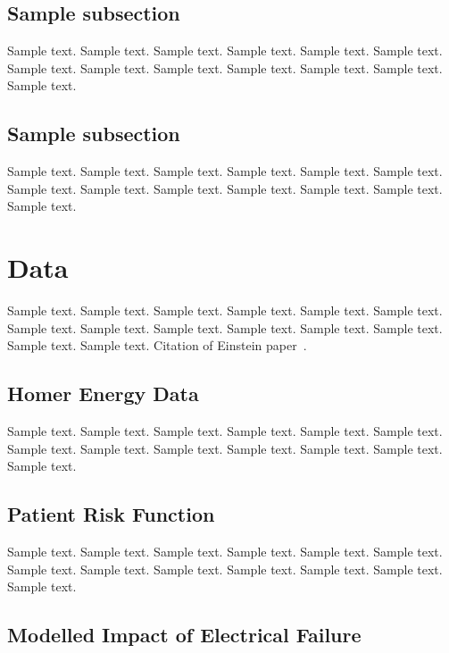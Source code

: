 \documentclass[preprint,12pt,3p]{elsarticle}
\begin{document}
\subsection{Sample subsection}
\label{subsec1}

Sample text. Sample text. Sample text. Sample text. Sample text. Sample text. 
Sample text. Sample text. Sample text. Sample text. Sample text. Sample text. 
Sample text. 

\subsection{Sample subsection}
\label{subsec2}

Sample text. Sample text. Sample text. Sample text. Sample text. Sample text. 
Sample text. Sample text. Sample text. Sample text. Sample text. Sample text. 
Sample text.

\section{Data}
\label{sec1}

Sample text. Sample text. Sample text. Sample text. Sample text. Sample text. 
Sample text. Sample text. Sample text. Sample text. Sample text. Sample text. 
Sample text. Sample text. Citation of Einstein paper~\cite{Einstein}.

\subsection{Homer Energy Data}
\label{subsec2}

Sample text. Sample text. Sample text. Sample text. Sample text. Sample text. 
Sample text. Sample text. Sample text. Sample text. Sample text. Sample text. 
Sample text.

\subsection{Patient Risk Function}
\label{subsec2}

Sample text. Sample text. Sample text. Sample text. Sample text. Sample text. 
Sample text. Sample text. Sample text. Sample text. Sample text. Sample text. 
Sample text.

\subsection{Modelled Impact of Electrical Failure}
\label{subsec2}
\end{document}

